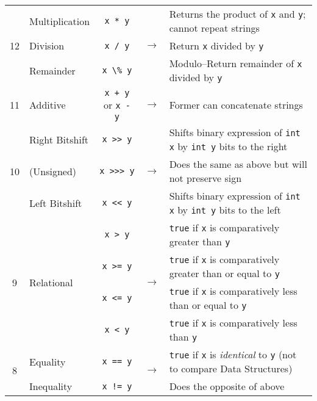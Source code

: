 \documentclass{article}
\begin{document}
\begin{center}
\begin{tabularx}{\textwidth}{clccX}
\multirow{3}{*}{12}  & Multiplication    & \lstinline|x * y| & \multirow{3}{*}{\(\to\)} & Returns the product of \lstinline|x| and \lstinline|y|; cannot repeat strings\\
& Division          & \lstinline|x / y| & & Return \lstinline|x| divided by \lstinline|y|\\
& Remainder         & \lstinline|x \% y| & & Modulo--Return remainder of \lstinline|x| divided by \lstinline|y|\\\midrule

11  & Additive          & \lstinline|x + y| or \lstinline|x - y| & \(\to\) & Former can concatenate strings\\\midrule

\multirow{3}{*}{10} & Right Bitshift & \lstinline|x >> y| & \multirow{3}{*}{\(\to\)} & Shifts binary expression of \lstinline|int x| by \lstinline|int y| bits to the right\\
& (Unsigned) & \lstinline|x >>> y| & & Does the same as above but will not preserve sign\\
& Left Bitshift & \lstinline|x << y| & & Shifts binary expression of \lstinline|int x| by \lstinline|int y| bits to the left\\\midrule

\multirow{4}{*}{9}  & \multirow{4}{*}{Relational} & \lstinline|x > y| & \multirow{4}{*}{\(\to\)} & \lstinline|true| if \lstinline|x| is comparatively greater than \lstinline|y| \\
& & \lstinline|x >= y| & & \lstinline|true| if \lstinline|x| is comparatively greater than or equal to \lstinline|y| \\
& & \lstinline|x <= y| & & \lstinline|true| if \lstinline|x| is comparatively less than or equal to \lstinline|y| \\
& & \lstinline|x < y| & & \lstinline|true| if \lstinline|x| is comparatively less than \lstinline|y| \\\midrule

\multirow{2}{*}{8} & Equality & \lstinline|x == y| & \multirow{2}{*}{\(\to\)} & \lstinline|true| if \lstinline|x| is \textit{identical} to \lstinline|y| (not to compare Data Structures)\\
& Inequality & \lstinline|x != y| &  & Does the opposite of above\\\midrule


\end{tabularx}
\end{center}
\end{document}
